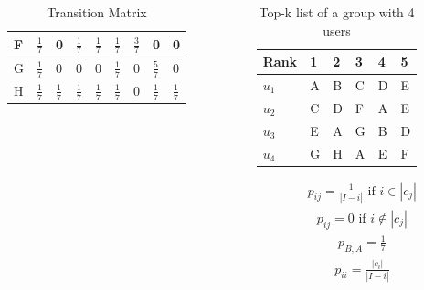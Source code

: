 \begin{frame}[t]
\begin{columns}
\begin{column}{0.6\textwidth}
\begin{table}
\begin{tabular}{|l|llllllll|}
		F & $\frac{1}{7}$ & 0 & $\frac{1}{7}$ & $\frac{1}{7}$ & $\frac{1}{7}$ & $\frac{3}{7}$ & 0 & 0 \\\hline
		G & $\frac{1}{7}$ & 0 & 0 & 0 & $\frac{1}{7}$ & 0 & $\frac{5}{7}$ & 0 \\\hline
		H & $\frac{1}{7}$ & $\frac{1}{7}$ & $\frac{1}{7}$ & $\frac{1}{7}$ & $\frac{1}{7}$ & 0 & $\frac{1}{7}$ & $\frac{1}{7}$ \\ \hline
	\end{tabular}
	\caption{Transition Matrix}
\end{table}
\normalsize
\end{column}
\begin{column}{0.5\textwidth}
	\small
	\vspace{-1.5cm}
	\begin{table}
		\captionsetup{font=footnotesize}
		\begin{tabular}{|l|lllll|} \hline
			Rank  & 1 & 2 & 3 & 4 & 5 \\\hline
			$u_1$ & A & B & C & D & E \\
			$u_2$ & C & D & F & A & E \\
			$u_3$ & E & A & G & B & D \\
			$u_4$ & G & H & A & E & F\\\hline
		\end{tabular}
		\caption{Top-k list of a group with 4 users}
	\end{table}
	\begin{align*}
	p_{ij} = \frac{1}{|I-i|} \text{ if } i \in |c_j|
	\end{align*}
	\begin{align*}
		p_{ij} = 0 \text{ if } i \notin |c_j|
	\end{align*}
	\begin{align*}
	p_{B,A} = \frac{1}{7}
	\end{align*}
	\begin{align*}
	p_{ii} = \frac{|c_i|}{|I-i|}
	\end{align*}
\end{column}
\end{columns}
\end{frame}

